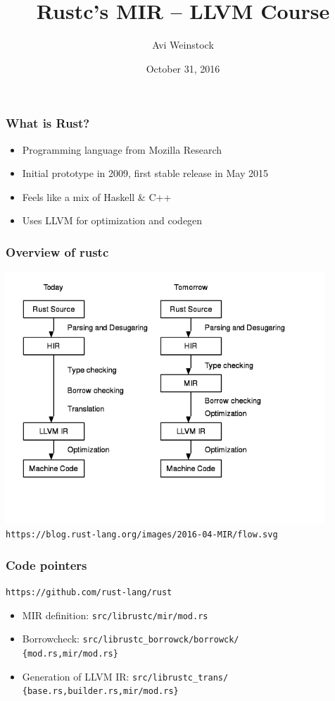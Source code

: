 \documentclass{beamer}
\title{Rustc's MIR -- LLVM Course}
\date{October 31, 2016}
\author{Avi Weinstock}
\begin{document}
\maketitle

\begin{frame}[fragile]
\frametitle{What is Rust?}
\begin{itemize}
\item
Programming language from Mozilla Research
\item
Initial prototype in 2009, first stable release in May 2015
\item
Feels like a mix of Haskell \& C++
\item
Uses LLVM for optimization and codegen
\end{itemize}
\end{frame}

\begin{frame}[fragile]
\frametitle{Overview of rustc}
\includegraphics[width=0.9\textwidth]{flow.png}\\
\verb|https://blog.rust-lang.org/images/2016-04-MIR/flow.svg|
\end{frame}

\begin{frame}[fragile]
\frametitle{Code pointers}
\verb|https://github.com/rust-lang/rust|
\begin{itemize}
\item MIR definition: \verb|src/librustc/mir/mod.rs|
\item Borrowcheck: \verb|src/librustc_borrowck/borrowck/|\\\verb|{mod.rs,mir/mod.rs}|
\item Generation of LLVM IR: \verb|src/librustc_trans/|\\\verb|{base.rs,builder.rs,mir/mod.rs}|
\end{itemize}
\end{frame}
\end{document}
